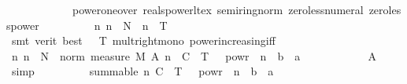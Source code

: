 \begin{isabellebody}
\ \ \ \ \ \ \ \ \ \ \ \ power{\isacharunderscore}{\kern0pt}one{\isacharunderscore}{\kern0pt}over\ reals{\isacharunderscore}{\kern0pt}power{\isacharunderscore}{\kern0pt}lt{\isacharunderscore}{\kern0pt}ex\ semiring{\isacharunderscore}{\kern0pt}norm{\isacharparenleft}{\kern0pt}{}{}{\isacharparenright}{\kern0pt}\ zero{\isacharunderscore}{\kern0pt}less{\isacharunderscore}{\kern0pt}numeral\ zero{\isacharunderscore}{\kern0pt}less{\isacharunderscore}{\kern0pt}power{\isacharparenright}{\kern0pt}\isanewline
\ \ \ \ \ \ \isamarkupfalse%
\ \isamarkupfalse%
\ {\isachardoublequoteopen}{\isasymAnd}n{\isachardot}{\kern0pt}\ n\ {\isasymge}\ N\ {\isasymLongrightarrow}\ {}{\isacharcircum}{\kern0pt}n\ {\isacharasterisk}{\kern0pt}\ T\ {\isasymge}\ {}{\isachardoublequoteclose}\ \isanewline
\ \ \ \ \ \ \ \ \isamarkupfalse%
\ {\isacharparenleft}{\kern0pt}smt\ {\isacharparenleft}{\kern0pt}verit{\isacharcomma}{\kern0pt}\ best{\isacharparenright}{\kern0pt}\ {\isacartoucheopen}{}\ {\isacharless}{\kern0pt}\ T{\isacartoucheclose}\ mult{\isacharunderscore}{\kern0pt}right{\isacharunderscore}{\kern0pt}mono\ power{\isacharunderscore}{\kern0pt}increasing{\isacharunderscore}{\kern0pt}iff{\isacharparenright}{\kern0pt}\isanewline
\ \ \ \ \ \ \isamarkupfalse%
\ \isamarkupfalse%
\ {\isachardoublequoteopen}{\isasymAnd}n{\isachardot}{\kern0pt}\ n\ {\isasymge}\ N\ {\isasymLongrightarrow}\ norm\ {\isacharparenleft}{\kern0pt}measure\ {\isacharquery}{\kern0pt}M\ {\isacharparenleft}{\kern0pt}A\ n{\isacharparenright}{\kern0pt}{\isacharparenright}{\kern0pt}\ {\isasymle}\ C\ {\isacharasterisk}{\kern0pt}\ T\ {\isacharasterisk}{\kern0pt}\ {}\ powr\ {\isacharparenleft}{\kern0pt}{\isacharminus}{\kern0pt}\ n\ {\isacharasterisk}{\kern0pt}\ {\isacharparenleft}{\kern0pt}b\ {\isacharminus}{\kern0pt}\ a\ {\isacharasterisk}{\kern0pt}\ {\isasymgamma}{\isacharparenright}{\kern0pt}{\isacharparenright}{\kern0pt}{\isachardoublequoteclose}\isanewline
\ \ \ \ \ \ \ \ \isamarkupfalse%
\ A\ \isamarkupfalse%
\ simp\isanewline
\ \ \ \ \ \ \isamarkupfalse%
\ \isamarkupfalse%
\ {\isachardoublequoteopen}summable\ {\isacharparenleft}{\kern0pt}{\isasymlambda}n{\isachardot}{\kern0pt}\ C\ {\isacharasterisk}{\kern0pt}\ T\ {\isacharasterisk}{\kern0pt}\ {}\ powr\ {\isacharparenleft}{\kern0pt}{\isacharminus}{\kern0pt}\ n\ {\isacharasterisk}{\kern0pt}\ {\isacharparenleft}{\kern0pt}b\ {\isacharminus}{\kern0pt}\ a\ {\isacharasterisk}{\kern0pt}\ {\isasymgamma}{\isacharparenright}{\kern0pt}{\isacharparenright}{\kern0pt}{\isacharparenright}{\kern0pt}{\isachardoublequoteclose}\isanewline

\end{isabellebody}
